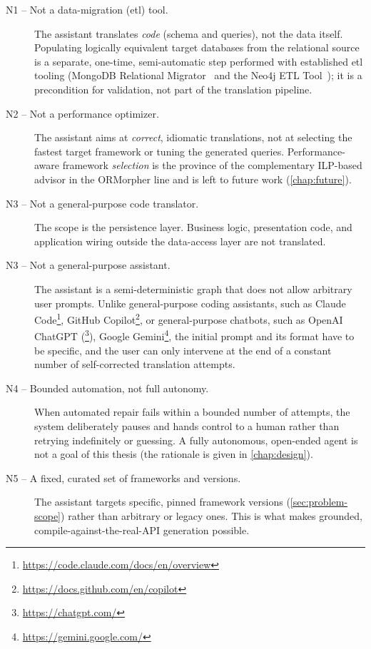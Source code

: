 \begin{description}
  \label{item:non-goal-n1} \item[N1 -- Not a data-migration (\acrshort{etl}) tool.] The assistant translates \emph{code} (schema and queries), not the data itself. Populating logically equivalent target databases from the relational source is a separate, one-time, semi-automatic step performed with established \Acrfull{etl} tooling (MongoDB Relational Migrator~\cite{mongo-rel-migrator} and the Neo4j ETL Tool~\cite{neo4j-etl-tool}); it is a precondition for validation, not part of the translation pipeline. 

  \item[N2 -- Not a performance optimizer.] The assistant aims at \emph{correct}, idiomatic translations, not at selecting the fastest target framework or tuning the generated queries. Performance-aware framework \emph{selection} is the province of the complementary ILP-based advisor in the ORMorpher line \cite{abrahamUnifiedFrameworkORM} and is left to future work (\cref{chap:future}).

  \item[N3 -- Not a general-purpose code translator.] The scope is the persistence layer. Business logic, presentation code, and application wiring outside the data-access layer are not translated.
  
  \item[N3 -- Not a general-purpose assistant.] The assistant is a semi-deterministic graph that does not allow arbitrary user prompts. Unlike general-purpose coding assistants, such as Claude Code\footnote{\url{https://code.claude.com/docs/en/overview}}, GitHub Copilot\footnote{\url{https://docs.github.com/en/copilot}}, or general-purpose chatbots, such as OpenAI ChatGPT (\footnote{\url{https://chatgpt.com/}}), Google Gemini\footnote{\url{https://gemini.google.com/}}, the initial prompt and its format have to be specific, and the user can only intervene at the end of a constant number of self-corrected translation attempts.

  \item[N4 -- Bounded automation, not full autonomy.] When automated repair fails within a bounded number of attempts, the system deliberately pauses and hands control to a human rather than retrying indefinitely or guessing. A fully autonomous, open-ended agent is not a goal of this thesis (the rationale is given in \cref{chap:design}).

  \item[N5 -- A fixed, curated set of frameworks and versions.] The assistant targets specific, pinned framework versions (\cref{sec:problem-scope}) rather than arbitrary or legacy ones. This is what makes grounded, compile-against-the-real-API generation possible.
\end{description}

